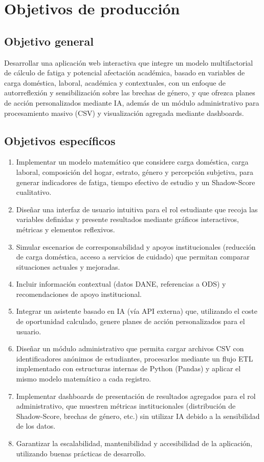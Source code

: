 \documentclass[12pt, spanish]{article}
\begin{document}
\section{Objetivos de producción}

\subsection{Objetivo general}
Desarrollar una aplicación web interactiva que integre un modelo multifactorial de cálculo de fatiga y potencial afectación académica, basado en variables de carga doméstica, laboral, académica y contextuales, con un enfoque de autorreflexión y sensibilización sobre las brechas de género, y que ofrezca planes de acción personalizados mediante IA, además de un módulo administrativo para procesamiento masivo (CSV) y visualización agregada mediante dashboards.

\subsection{Objetivos específicos}
\begin{enumerate}
    \item Implementar un modelo matemático que considere carga doméstica, carga laboral, composición del hogar, estrato, género y percepción subjetiva, para generar indicadores de fatiga, tiempo efectivo de estudio y un Shadow-Score cualitativo.
    \item Diseñar una interfaz de usuario intuitiva para el rol estudiante que recoja las variables definidas y presente resultados mediante gráficos interactivos, métricas y elementos reflexivos.
    \item Simular escenarios de corresponsabilidad y apoyos institucionales (reducción de carga doméstica, acceso a servicios de cuidado) que permitan comparar situaciones actuales y mejoradas.
    \item Incluir información contextual (datos DANE, referencias a ODS) y recomendaciones de apoyo institucional.
    \item Integrar un asistente basado en IA (vía API externa) que, utilizando el coste de oportunidad calculado, genere planes de acción personalizados para el usuario.
    \item Diseñar un módulo administrativo que permita cargar archivos CSV con identificadores anónimos de estudiantes, procesarlos mediante un flujo ETL implementado con estructuras internas de Python (Pandas) y aplicar el mismo modelo matemático a cada registro.
    \item Implementar dashboards de presentación de resultados agregados para el rol administrativo, que muestren métricas institucionales (distribución de Shadow-Score, brechas de género, etc.) sin utilizar IA debido a la sensibilidad de los datos.
    \item Garantizar la escalabilidad, mantenibilidad y accesibilidad de la aplicación, utilizando buenas prácticas de desarrollo.
\end{enumerate}
\end{document}
